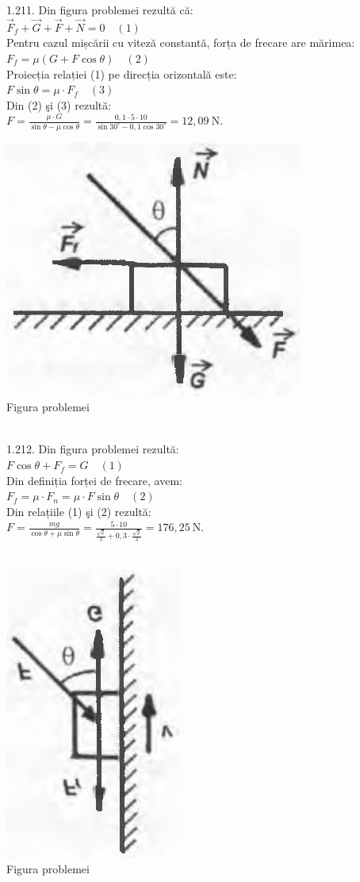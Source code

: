 1.211. Din figura problemei rezultă că:\\ $\vec{F}_{f}+\vec{G}+\vec{F}+\vec{N}=0 \quad (1)$\\ Pentru cazul mișcării cu viteză constantă, forța de frecare are mărimea:\\ $F_{f}=\mu(G+F \cos \theta) \quad (2)$\\ Proiecția relației (1) pe direcția orizontală este:\\ $F \sin \theta=\mu \cdot F_{f} \quad (3)$\\ Din (2) şi (3) rezultă:\\ $F=\frac{\mu \cdot G}{\sin \theta-\mu \cos \theta}=\frac{0,1 \cdot 5 \cdot 10}{\sin 30^{\circ}-0,1 \cos 30^{\circ}}=12,09 \mathrm{~N}$.\\ \begin{center} \includegraphics[width=0.4\linewidth]{images/2025_07_01_5b3ff9fa0d508c8e9f17g-244}\\ Figura problemei \end{center}\\

1.212. Din figura problemei rezultă:\\ $F \cos \theta+F_{f}=G \quad (1)$\\ Din definiția forței de frecare, avem:\\ $F_{f}=\mu \cdot F_{n}=\mu \cdot F \sin \theta \quad (2)$\\ Din relațiile (1) şi (2) rezultă:\\ $F=\frac{m g}{\cos \theta+\mu \sin \theta}=\frac{5 \cdot 10}{\frac{\sqrt{2}}{2}+0,3 \cdot \frac{\sqrt{2}}{2}}=176,25 \mathrm{~N}$.\\ \\ \begin{center} \includegraphics[width=0.4\linewidth]{images/2025_07_01_5b3ff9fa0d508c8e9f17g-244(1)}\\ Figura problemei \end{center}\\

